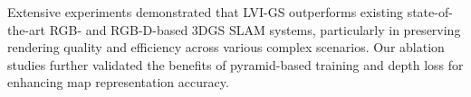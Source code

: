\documentclass[lettersize,journal]{IEEEtran}
\begin{document}
Extensive experiments demonstrated that LVI-GS outperforms existing state-of-the-art RGB- and RGB-D-based 3DGS SLAM systems, particularly in preserving rendering quality and efficiency across various complex scenarios. Our ablation studies further validated the benefits of pyramid-based training and depth loss for enhancing map representation accuracy.

\textcolor{red}{}





\end{document}
